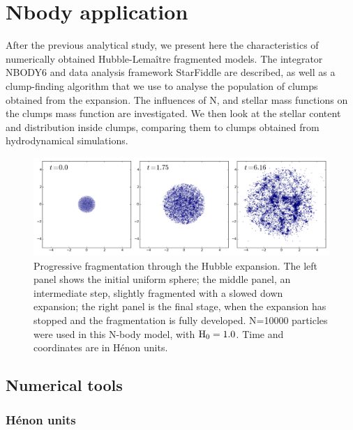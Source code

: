 

\chapter{Nbody application}
\label{Chap:nbody}

After the previous analytical study, we present here the characteristics of numerically obtained Hubble-Lema\^itre fragmented models. The integrator NBODY6 and data analysis framework StarFiddle are described, as well as a clump-finding algorithm that we use to analyse the population of clumps obtained from the expansion. The influences of N, \tHub and stellar mass functions on the clumps mass function are investigated. We then look at the stellar content and distribution inside clumps, comparing them to clumps obtained from hydrodynamical simulations.


\minitoc



\begin{figure}
\begin{center}
\includegraphics[width=\textwidth]{Figures/2_fragmentation}
\caption{Progressive fragmentation through the Hubble expansion. The left panel shows the initial uniform sphere; the middle panel, an intermediate step, slightly fragmented with a slowed down expansion; the right panel is the final stage, when the expansion has stopped and the fragmentation is fully developed. N=10000 particles were used in this N-body model, with ${\textrm{H}}_0 = 1.0$. Time and coordinates are in H\'enon units.}
\label{Fig:2_fragmentation}
\end{center}
\end{figure}




\section{Numerical tools}

\subsection{H\'enon units}


